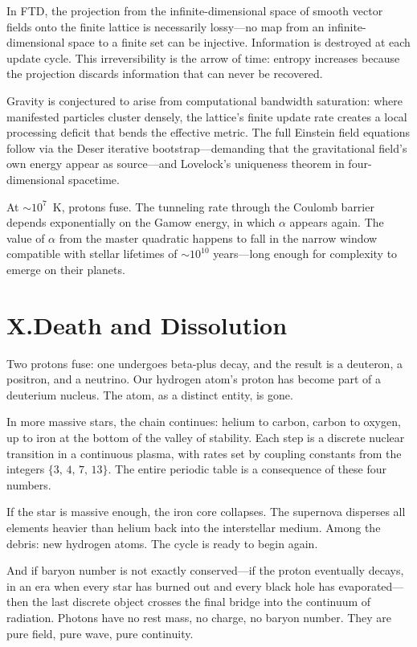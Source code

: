 \documentclass[11pt,a4paper]{article}
\begin{document}
In FTD, the projection from the infinite-dimensional space of smooth vector fields onto the finite lattice is necessarily lossy---no map from an infinite-dimensional space to a finite set can be injective. Information is destroyed at each update cycle. This irreversibility is the arrow of time: entropy increases because the projection discards information that can never be recovered.

Gravity is conjectured to arise from computational bandwidth saturation: where manifested particles cluster densely, the lattice's finite update rate creates a local processing deficit that bends the effective metric. The full Einstein field equations follow via the Deser iterative bootstrap---demanding that the gravitational field's own energy appear as source---and Lovelock's uniqueness theorem in four-dimensional spacetime.

At $\sim 10^7$~K, protons fuse. The tunneling rate through the Coulomb barrier depends exponentially on the Gamow energy, in which $\alpha$ appears again. The value of $\alpha$ from the master quadratic happens to fall in the narrow window compatible with stellar lifetimes of $\sim 10^{10}$ years---long enough for complexity to emerge on their planets.

\section*{X.\quad Death and Dissolution}

Two protons fuse: one undergoes beta-plus decay, and the result is a deuteron, a positron, and a neutrino. Our hydrogen atom's proton has become part of a deuterium nucleus. The atom, as a distinct entity, is gone.

In more massive stars, the chain continues: helium to carbon, carbon to oxygen, up to iron at the bottom of the valley of stability. Each step is a discrete nuclear transition in a continuous plasma, with rates set by coupling constants from the integers $\{3,\,4,\,7,\,13\}$. The entire periodic table is a consequence of these four numbers.

If the star is massive enough, the iron core collapses. The supernova disperses all elements heavier than helium back into the interstellar medium. Among the debris: new hydrogen atoms. The cycle is ready to begin again.

And if baryon number is not exactly conserved---if the proton eventually decays, in an era when every star has burned out and every black hole has evaporated---then the last discrete object crosses the final bridge into the continuum of radiation. Photons have no rest mass, no charge, no baryon number. They are pure field, pure wave, pure continuity.
\end{document}
